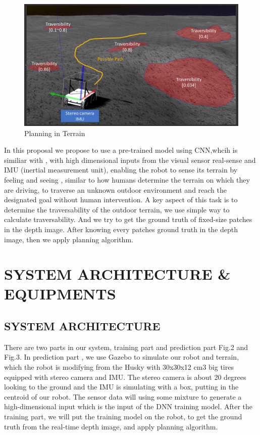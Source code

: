 \documentclass[letterpaper, 10 pt, conference]{ieeeconf}  %
\begin{document}
\begin{figure}[t] %
\includegraphics[width=0.8\columnwidth]{teaser}
\centering
\caption{Planning in Terrain}
 \label{figure:teaser}
\end{figure}


In this proposal we propose to use a pre-trained model using CNN,whcih is similiar with \cite{chavez2017learning}, with high dimensional inputs from the visual sensor real-sense and  IMU (inertial measurement unit), enabling the robot to sense its terrain by feeling and seeing , similar to how humans determine the terrain on which they are driving,  to traverse an  unknown outdoor environment and  reach the designated goal without human intervention. A key aspect of this task is to determine the traversability of the outdoor terrain, we use \cite{JiatongBao2012} simple way to calculate traversability. And we try to get the ground truth of  fixed-size patches in the depth image. After knowing every patches ground truth in the depth image, then we apply planning algorithm. 
\section{SYSTEM ARCHITECTURE \& EQUIPMENTS}

\subsection{SYSTEM ARCHITECTURE}

There are two parts in our system, training part and prediction part Fig.2 and Fig.3. In prediction part , we use Gazebo to simulate our robot and terrain, which the robot is modifying from the Husky with 30x30x12 cm3 big tires equipped with stereo camera and IMU. The stereo camera is about 20 degrees looking to the ground and the IMU is simulating with a box, putting in the centroid of our robot. The sensor data will using some mixture to generate a high-dimensional input which is the input of the DNN training model.
After the training part, we will put the training model on  the robot, to get the ground truth from the real-time depth image, and apply planning algorithm.
\end{document}

